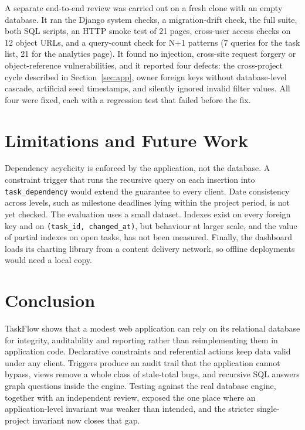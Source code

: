 \documentclass[conference]{IEEEtran}
\begin{document}
A separate end-to-end review was carried out on a fresh clone with an empty
database. It ran the Django system checks, a migration-drift check, the full
suite, both SQL scripts, an HTTP smoke test of 21 pages, cross-user access
checks on 12 object URLs, and a query-count check for N+1 patterns (7 queries
for the task list, 21 for the analytics page). It found no injection,
cross-site request forgery or object-reference vulnerabilities, and it reported
four defects: the cross-project cycle described in
Section~\ref{sec:app}, owner foreign keys without database-level cascade,
artificial seed timestamps, and silently ignored invalid filter values. All
four were fixed, each with a regression test that failed before the fix.

\section{Limitations and Future Work}

Dependency acyclicity is enforced by the application, not the database. A
constraint trigger that runs the recursive query on each insertion into
\texttt{task\_dependency} would extend the guarantee to every client. Date
consistency across levels, such as milestone deadlines lying within the project
period, is not yet checked. The evaluation uses a small dataset. Indexes exist
on every foreign key and on \texttt{(task\_id, changed\_at)}, but behaviour at
larger scale, and the value of partial indexes on open tasks, has not been
measured. Finally, the dashboard loads its charting library from a content
delivery network, so offline deployments would need a local copy.

\section{Conclusion}

TaskFlow shows that a modest web application can rely on its relational
database for integrity, auditability and reporting rather than reimplementing
them in application code. Declarative constraints and referential actions keep
data valid under any client. Triggers produce an audit trail that the
application cannot bypass, views remove a whole class of stale-total bugs, and
recursive SQL answers graph questions inside the engine. Testing against the
real database engine, together with an independent review, exposed the one
place where an application-level invariant was weaker than intended, and the
stricter single-project invariant now closes that gap.
\end{document}
